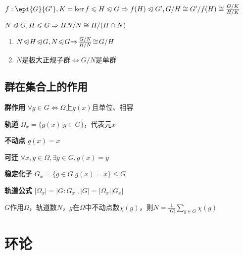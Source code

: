 \documentclass[b4paper, 10pt]{ctexart}
\newcommand*{\impl}{\Rightarrow}
\renewcommand*{\iff}{\Leftrightarrow}
\renewcommand*{\leq}{\leqslant}
\newcommand*{\nmsubgroupeq}{\trianglelefteqslant}
\begin{document}
\begin{multicols}{3}
    \begin{theorem}
        \hfil

        $f: \epi{G}{G'}, K = \ker f \leq H \nmsubgroupeq G \impl f(H) \nmsubgroupeq G', G/H \cong G'/f(H) \cong \frac{G/K}{H/K}$
    \end{theorem}

    \begin{theorem}
        \hfil

        $N \nmsubgroupeq G, H \leq G \impl HN/N \cong H/(H \cap N)$
    \end{theorem}

    \begin{theorem}[推论]
        \hfil
        \begin{enumerate}
            \item $N \!\nmsubgroupeq\! H \!\nmsubgroupeq\! G, N \!\nmsubgroupeq\! G \!\impl\! \frac{G/N}{H/N} \!\cong\! G/H$
            \item $N$是极大正规子群$\iff G/N$是单群
        \end{enumerate}
    \end{theorem}

    \subsection{群在集合上的作用}

    \textbf{群作用} $\forall g \in G \iff \Omega$上$g(x)$且单位、相容

    \textbf{轨道} $\Omega_x = \{ g(x) | g \in G \}$，代表元$x$

    \textbf{不动点} $g(x) = x$

    \textbf{可迁} $\forall x, y \in \Omega, \exists g \in G, g(x) = y$

    \textbf{稳定化子} $G_x \! = \! \{ g \!\in\! G | g(x) \! = \! x \} \!\leq\! G$

    \textbf{轨道公式} $|\Omega_x| = |G : G_x|, |G| = |\Omega_x||G_x|$

    \begin{theorem}[Burnside 引理]
        $G$作用$\Omega$，轨道数$N$，$g$在$\Omega$中不动点数$\chi(g)$，则$N = \frac{1}{|G|} \sum\limits_{g \in G} \chi(g)$
    \end{theorem}

    \section{环论}


\end{multicols}
\end{document}
